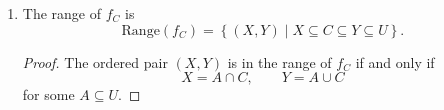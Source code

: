 \begin{enumerate}
\begin{enumerate}
\begin{proof}
                    We have $K \subseteq S$ and $S \subseteq K$, hence $S = K$.
                \end{proof}

                \medskip

                \begin{proposition} \label{prop:1a}
                    The function $f_C$ is injective.
                \end{proposition}

                \medskip

                \begin{proof}
                    Take two arbitrary subsets $X$ and $Y$ of $U$.
                    If $f_C(X) = f_C(Y)$, then we have
                    \begin{equation} \label{eq:1a-1}
                        X \cap C = Y \cap C, \qquad X \cup C = Y \cup C.
                    \end{equation}

                    Substituting $K = X$, $L = C$ into \cref{lem:1a-1},we obtain the equality
                    \begin{align*}
                        X &= (X \cap C) \cup \left[(X \cup C) \, \backslash \, C\right]. \\
                        \intertext{Similarly,}
                        Y &= (Y \cap C) \cup \left[(Y \cup C) \, \backslash \, C\right].
                    \end{align*}
                    From \cref{eq:1a-1}, it follows that $X = Y$, therefore
                    \[ f_C(X) = f_C(Y) \implies X = Y \]
                    and $f_C$ is injective.
                \end{proof}

                \bigskip

            \item
                \begin{proposition} \label{prop:1b}
                    The range of $f_C$ is
                    \[ \mathrm{Range}(f_C) = \left\{(X, Y) \; \big| \; X \subseteq C \subseteq Y \subseteq U\right\}. \]
                \end{proposition}

                \medskip

                \begin{proof}
                    The ordered pair $(X, Y)$ is in the range of $f_C$ if and only if
                    \[ X = A \cap C, \qquad Y = A \cup C \]
                    for some $A \subseteq U$.


\end{proof}
\end{enumerate}
\end{enumerate}
